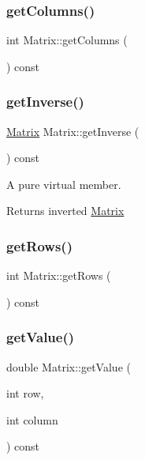 \subsubsection{\texorpdfstring{get\+Columns()}{getColumns()}}
{\footnotesize\ttfamily int Matrix\+::get\+Columns (\begin{DoxyParamCaption}{ }\end{DoxyParamCaption}) const}

\mbox{\label{classMatrix_ade3fcddb0cc6a7e221a94e13afc7752c}} 
\subsubsection{\texorpdfstring{get\+Inverse()}{getInverse()}}
{\footnotesize\ttfamily \hyperlink{classMatrix}{Matrix} Matrix\+::get\+Inverse (\begin{DoxyParamCaption}{ }\end{DoxyParamCaption}) const}

A pure virtual member. \begin{DoxyReturn}{Returns}
inverted \hyperlink{classMatrix}{Matrix} 
\end{DoxyReturn}
\mbox{\label{classMatrix_ad1b2433d295efcbf371e6f636db757e9}} 
\subsubsection{\texorpdfstring{get\+Rows()}{getRows()}}
{\footnotesize\ttfamily int Matrix\+::get\+Rows (\begin{DoxyParamCaption}{ }\end{DoxyParamCaption}) const}

\mbox{\label{classMatrix_ab752671c6461d950962e151a1af251ce}} 
\subsubsection{\texorpdfstring{get\+Value()}{getValue()}}
{\footnotesize\ttfamily double Matrix\+::get\+Value (\begin{DoxyParamCaption}\item[{int}]{row,  }\item[{int}]{column }\end{DoxyParamCaption}) const}

